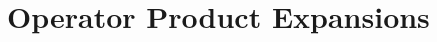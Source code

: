 \documentclass[11pt,a4paper]{article}
\numberwithin{equation}{subsection}
\begin{document}
\setcounter{section}{19}
\section{Operator Product Expansions}

\label{ch20-ref-1}
\label{ch20-ref-2}
\label{ch20-ref-3}




\end{document}
